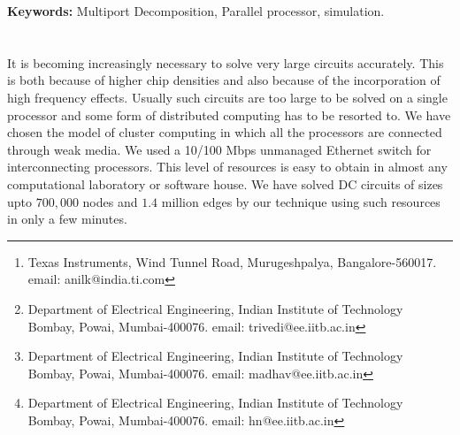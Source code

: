 \documentclass[10pt,psfig,letterpaper,twocolumn]{article}
\begin{document}
 
% 
%


\title{}
\author{
{}\thanks{Texas Instruments, Wind Tunnel Road, Murugeshpalya, Bangalore-560017. email: anilk@india.ti.com }, \and
{}\thanks{Department of Electrical Engineering, Indian Institute of Technology Bombay, Powai, Mumbai-400076. email: trivedi@ee.iitb.ac.in}, \and 
{}\thanks{Department of Electrical Engineering, Indian Institute of Technology Bombay, Powai, Mumbai-400076. email: madhav@ee.iitb.ac.in}, \and
{}\thanks{ Department of Electrical Engineering, Indian Institute of Technology Bombay, Powai, Mumbai-400076. email: hn@ee.iitb.ac.in}\\
}
\date{}
\maketitle

\thispagestyle{empty}


{\bf Keywords:}
Multiport Decomposition, Parallel processor, simulation.

\section*{}

It is becoming increasingly necessary to solve very large circuits
accurately. This is both because of higher chip densities and also
because of
the incorporation of high frequency effects.
Usually such circuits are too large to be solved on a single
processor and some form of distributed computing has to be resorted to.
We have chosen the model of cluster computing in which all the processors are connected 
through  weak media. 
We used a 10/100 Mbps unmanaged Ethernet switch for interconnecting processors. 
This level of resources is easy to obtain in almost any computational
laboratory or software house. We have solved DC circuits of sizes
upto $700,000$ nodes and $1.4$ million edges by our technique 
using such resources in only a few minutes.
\par
\end{document}
